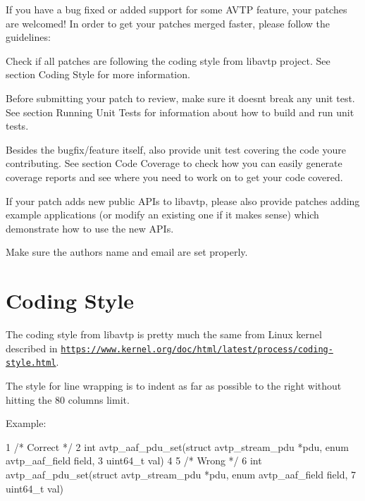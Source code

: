 If you have a bug fixed or added support for some A\+V\+TP feature, your patches are welcomed! In order to get your patches merged faster, please follow the guidelines\+:


\begin{DoxyItemize}
\item Check if all patches are following the coding style from libavtp project. See section \textquotesingle{}Coding Style\textquotesingle{} for more information.
\item Before submitting your patch to review, make sure it doesn\textquotesingle{}t break any unit test. See section \textquotesingle{}Running Unit Tests\textquotesingle{} for information about how to build and run unit tests.
\item Besides the bugfix/feature itself, also provide unit test covering the code you\textquotesingle{}re contributing. See section \textquotesingle{}Code Coverage\textquotesingle{} to check how you can easily generate coverage reports and see where you need to work on to get your code covered.
\item If your patch adds new public A\+P\+Is to libavtp, please also provide patches adding example applications (or modify an existing one if it makes sense) which demonstrate how to use the new A\+P\+Is.
\item Make sure the author\textquotesingle{}s name and email are set properly.
\end{DoxyItemize}

\section*{Coding Style}

The coding style from libavtp is pretty much the same from Linux kernel described in \href{https://www.kernel.org/doc/html/latest/process/coding-style.html}{\tt https\+://www.\+kernel.\+org/doc/html/latest/process/coding-\/style.\+html}.

The style for line wrapping is to indent as far as possible to the right without hitting the 80 columns limit.

Example\+:


\begin{DoxyCode}
1 /* Correct */
2 int avtp\_aaf\_pdu\_set(struct avtp\_stream\_pdu *pdu, enum avtp\_aaf\_field field,
3                                 uint64\_t val)
4 
5 /* Wrong */
6 int avtp\_aaf\_pdu\_set(struct avtp\_stream\_pdu *pdu, enum avtp\_aaf\_field field,
7              uint64\_t val)
\end{DoxyCode}


